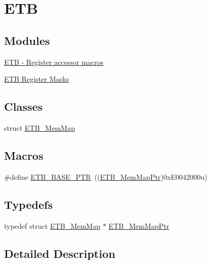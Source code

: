 \hypertarget{group___e_t_b___peripheral}{}\section{E\+TB}
\label{group___e_t_b___peripheral}
\subsection*{Modules}
\begin{DoxyCompactItemize}
\item 
\hyperlink{group___e_t_b___register___accessor___macros}{E\+T\+B -\/ Register accessor macros}
\item 
\hyperlink{group___e_t_b___register___masks}{E\+T\+B Register Masks}
\end{DoxyCompactItemize}
\subsection*{Classes}
\begin{DoxyCompactItemize}
\item 
struct \hyperlink{struct_e_t_b___mem_map}{E\+T\+B\+\_\+\+Mem\+Map}
\end{DoxyCompactItemize}
\subsection*{Macros}
\begin{DoxyCompactItemize}
\item 
\#define \hyperlink{group___e_t_b___peripheral_gaaefe9b614cb5542a69cb7461307f1267}{E\+T\+B\+\_\+\+B\+A\+S\+E\+\_\+\+P\+TR}~((\hyperlink{group___e_t_b___peripheral_ga8b44c770780865d622e8799d88981d9e}{E\+T\+B\+\_\+\+Mem\+Map\+Ptr})0x\+E0042000u)
\end{DoxyCompactItemize}
\subsection*{Typedefs}
\begin{DoxyCompactItemize}
\item 
typedef struct \hyperlink{struct_e_t_b___mem_map}{E\+T\+B\+\_\+\+Mem\+Map} $\ast$ \hyperlink{group___e_t_b___peripheral_ga8b44c770780865d622e8799d88981d9e}{E\+T\+B\+\_\+\+Mem\+Map\+Ptr}
\end{DoxyCompactItemize}


\subsection{Detailed Description}


